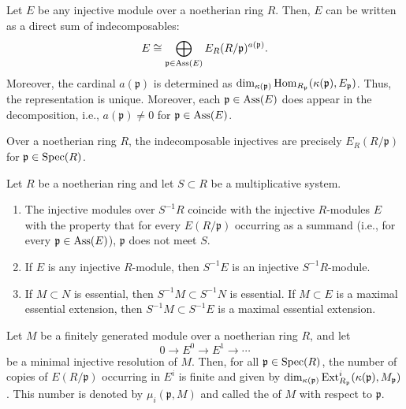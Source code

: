 \documentclass[12pt]{article}
\begin{document}
\begin{thm}
	Let $E$ be any injective module over a noetherian ring $R$. Then, $E$ can be written as a direct sum of indecomposables:
	\begin{equation*} 
		E \cong \bigoplus_{\mathfrak{p} \in \operatorname{Ass}(E)} E_{R}(R/\mathfrak{p})^{a(\mathfrak{p})}.
	\end{equation*}
	Moreover, the cardinal $a(\mathfrak{p})$ is determined as $\dim_{\kappa(\mathfrak{p})} \operatorname{Hom}_{R_{\mathfrak{p}}}(\kappa(\mathfrak{p}), E_{\mathfrak{p}})$. Thus, the representation is unique. Moreover, each $\mathfrak{p} \in \operatorname{Ass}(E)$ does appear in the decomposition, i.e., $a(\mathfrak{p}) \neq 0$ for $\mathfrak{p} \in \operatorname{Ass}(E)$.
\end{thm}
\begin{cor}
	Over a noetherian ring $R$, the indecomposable injectives are precisely $E_{R}(R/\mathfrak{p})$ for $\mathfrak{p} \in \operatorname{Spec}(R)$.
\end{cor}

\begin{thm}
	Let $R$ be a noetherian ring and let $S \subset R$ be a multiplicative system.
	\begin{enumerate}[label=(\alph*)]
		\item The injective modules over $S^{-1} R$ coincide with the injective $R$-modules $E$ with the property that for every $E(R/\mathfrak{p})$ occurring as a summand (i.e., for every $\mathfrak{p} \in \operatorname{Ass}(E)$), $\mathfrak{p}$ does not meet $S$.
		\item If $E$ is any injective $R$-module, then $S^{-1} E$ is an injective $S^{-1} R$-module.
		\item If $M \subset N$ is essential, then $S^{-1} M \subset S^{-1} N$ is essential. If $M \subset E$ is a maximal essential extension, then $S^{-1} M \subset S^{-1} E$ is a maximal essential extension.
	\end{enumerate}
\end{thm}

\begin{thm}
	Let $M$ be a finitely generated module over a noetherian ring $R$, and let 
	\begin{equation*} 
		0 \to E^{0} \to E^{1} \to \cdots
	\end{equation*}
	be a minimal injective resolution of $M$. Then, for all $\mathfrak{p} \in \operatorname{Spec}(R)$, the number of copies of $E(R/\mathfrak{p})$ occurring in $E^{i}$ is finite and given by $\dim_{\kappa(\mathfrak{p})} \operatorname{Ext}^{i}_{R_{\mathfrak{p}}}(\kappa(\mathfrak{p}), M_{\mathfrak{p}})$. This number is denoted by $\mu_{i}(\mathfrak{p}, M)$ and called the  of $M$ with respect to $\mathfrak{p}$.
\end{thm}
\end{document}
